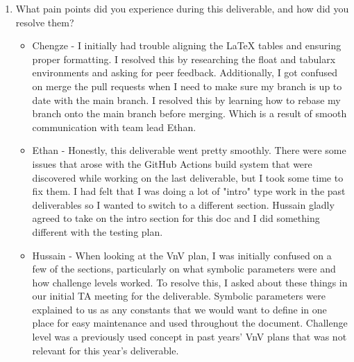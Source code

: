 \documentclass[12pt, titlepage]{article}
\begin{document}
\begin{enumerate}
\begin{itemize}
      that working on the VnV (which builds on the SRS and other relating
      documents a bit) was very smooth. Since the SRS was well organized and
      most of the members were familiar with it's contents, we were able to
      efficiently reference it and complete the VnV Plan at a good pace.
    \item Kevin -What went well during this deliverable is our groups ability to communicate and assign
    work. We managed to have everyone assigned parts of the VnV document much in advance giving us time
    work on it. This also let us look over the VnV, estimating the amount of work expected, and properly
    plan on time to finish it.
  \end{itemize}
  \item What pain points did you experience during this deliverable, and how
    did you resolve them?
  \begin{itemize}
    \item Chengze - I initially had trouble aligning the LaTeX tables and ensuring proper formatting. I resolved
    this by researching the float and tabularx environments and asking for peer feedback. Additionally, I got confused
    on merge the pull requests when I need to make sure my branch is up to date with the main branch. I resolved this by
    learning how to rebase my branch onto the main branch before merging. Which is a result of smooth communication with
    team lead Ethan.
    \item Ethan - Honestly, this deliverable went pretty smoothly. There were
      some issues that arose with the GitHub Actions build system that were
      discovered while working on the last deliverable, but I took some time to
      fix them. I had felt that I was doing a lot of "intro" type work in the
      past deliverables so I wanted to switch to a different section. Hussain
      gladly agreed to take on the intro section for this doc and I did
      something different with the testing plan.
    \item Hussain - When looking at the VnV plan, I was initially confused
    on a few of the sections, particularly on what symbolic parameters were
    and how challenge levels worked. To resolve this, I asked about these
    things in our initial TA meeting for the deliverable. Symbolic parameters
    were explained to us as any constants that we would want to define in one
    place for easy maintenance and used throughout the document. Challenge
    level was a previously used concept in past years' VnV plans that was
    not relevant for this year's deliverable.

\end{itemize}
\end{enumerate}
\end{document}
